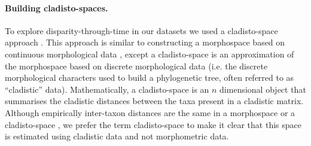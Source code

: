 \documentclass[12pt,a4paper]{article}
\begin{document}
\paragraph{Building cladisto-spaces.} 
To explore disparity-through-time in our datasets we used a cladisto-space approach \citep[e.g.][]{Foote01071994,Foote29111996,Wesley-Hunt2005,Brusatte12092008,friedmanexplosive2010,toljagictriassic-jurassic2013,Hughes20082013}.
This approach is similar to constructing a morphospace based on continuous morphological data \citep[e.g.][]{friedmanexplosive2010}, except a cladisto-space is an approximation of the morphospace based on discrete morphological data (i.e. the discrete morphological characters used to build a phylogenetic tree, often referred to as ``cladistic'' data).
Mathematically, a cladisto-space is an $n$ dimensional object that summarises the cladistic distances between the taxa present in a cladistic matrix.
Although empirically inter-taxon distances are the same in a morphospace or a cladisto-space \citep{foth2012different,hetherington2015cladistic}, we prefer the term cladisto-space to make it clear that this space is estimated using cladistic data and not morphometric data.
\end{document}
